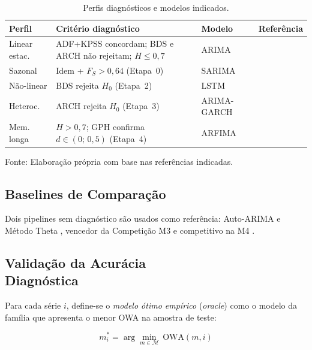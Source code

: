 \documentclass[12pt, a4paper]{article}
\begin{document}
\begin{table}[H]
  \centering
  \caption{Perfis diagnósticos e modelos indicados.}
  \label{tab:perfis}
  \small
  \setlength{\tabcolsep}{4pt}
  \begin{tabular}{p{1.1cm}p{2.6cm}p{1.6cm}p{2.3cm}}
    \toprule
    \textbf{Perfil} & \textbf{Critério diagnóstico} & \textbf{Modelo} & \textbf{Referência} \\
    \midrule
    Linear estac. &
    ADF+KPSS concordam; BDS e ARCH não rejeitam; $H \leq 0{,}7$ &
    ARIMA &
    \cite{said1984testing,kwiatkowski1992testing} \\[3pt]
    Sazonal &
    Idem + $F_S > 0{,}64$ (Etapa~0) &
    SARIMA &
    \cite{hyndman2018forecasting} \\[3pt]
    Não-linear &
    BDS rejeita $H_0$ (Etapa~2) &
    LSTM &
    \cite{broock1996test} \\[3pt]
    Heteroc. &
    ARCH rejeita $H_0$ (Etapa~3) &
    ARIMA-GARCH &
    \cite{engle1982autoregressive} \\[3pt]
    Mem. longa &
    $H > 0{,}7$; GPH confirma $d \in (0;\,0{,}5)$ (Etapa~4) &
    ARFIMA &
    \cite{hurst1951long-storage,geweke1983estimation} \\
    \bottomrule
  \end{tabular}

  \vspace{2pt}
  \small Fonte: Elaboração própria com base nas referências indicadas.
\end{table}

\subsection{Baselines de Comparação}

Dois pipelines sem diagnóstico são usados como referência: Auto-ARIMA
\cite{hyndman2018forecasting} e Método Theta \cite{assimakopoulos2000theta},
vencedor da Competição M3 e competitivo na M4 \cite{makridakis2018m4results}.

\subsection{Validação da Acurácia\\ Diagnóstica}

Para cada série $i$, define-se o \textit{modelo ótimo empírico} (\textit{oracle})
como o modelo da família que apresenta o menor OWA na amostra de teste:

\begin{equation}
  m^*_i = \arg\min_{m \in \mathcal{M}} \,\text{OWA}(m, i)
  \label{eq:oracle}
\end{equation}
\end{document}
